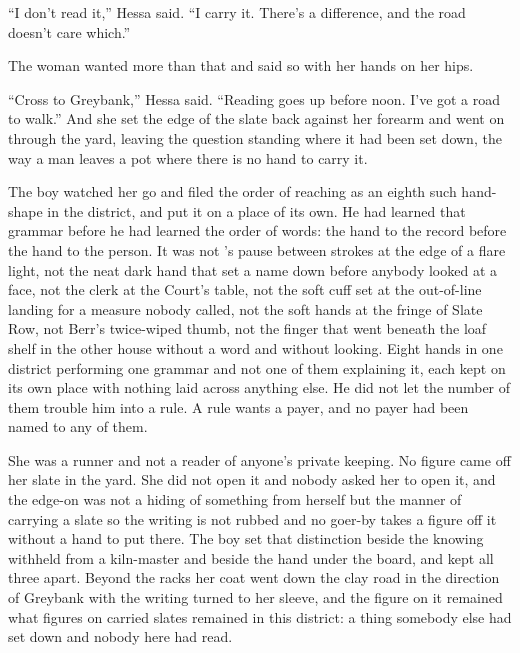 “I don't read it,” Hessa said. “I carry it. There's a difference, and the road doesn't care which.”

The woman wanted more than that and said so with her hands on her hips.

“Cross to Greybank,” Hessa said. “Reading goes up before noon. I've got a road to walk.” And she set the edge of the slate back against her forearm and went on through the yard, leaving the question standing where it had been set down, the way a man leaves a pot where there is no hand to carry it.

The boy watched her go and filed the order of reaching as an eighth such hand-shape in the district, and put it on a place of its own. He had learned that grammar before he had learned the order of words: the hand to the record before the hand to the person. It was not 's pause between strokes at the edge of a flare light, not the neat dark hand that set a name down before anybody looked at a face, not the clerk at the Court's table, not the soft cuff set at the out-of-line landing for a measure nobody called, not the soft hands at the fringe of Slate Row, not Berr's twice-wiped thumb, not the finger that went beneath the loaf shelf in the other house without a word and without looking. Eight hands in one district performing one grammar and not one of them explaining it, each kept on its own place with nothing laid across anything else. He did not let the number of them trouble him into a rule. A rule wants a payer, and no payer had been named to any of them.

She was a runner and not a reader of anyone's private keeping. No figure came off her slate in the yard. She did not open it and nobody asked her to open it, and the edge-on was not a hiding of something from herself but the manner of carrying a slate so the writing is not rubbed and no goer-by takes a figure off it without a hand to put there. The boy set that distinction beside the knowing withheld from a kiln-master and beside the hand under the board, and kept all three apart. Beyond the racks her coat went down the clay road in the direction of Greybank with the writing turned to her sleeve, and the figure on it remained what figures on carried slates remained in this district: a thing somebody else had set down and nobody here had read.

\scenebreak

